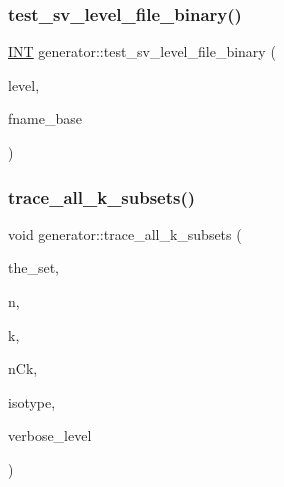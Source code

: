 \mbox{\label{classgenerator_a626488ba73670d1e4f163618f340a94f}} 
\subsubsection{\texorpdfstring{test\+\_\+sv\+\_\+level\+\_\+file\+\_\+binary()}{test\_sv\_level\_file\_binary()}}
{\footnotesize\ttfamily \mbox{\hyperlink{galois_8h_a09fddde158a3a20bd2dcadb609de11dc}{I\+NT}} generator\+::test\+\_\+sv\+\_\+level\+\_\+file\+\_\+binary (\begin{DoxyParamCaption}\item[{\mbox{\hyperlink{galois_8h_a09fddde158a3a20bd2dcadb609de11dc}{I\+NT}}}]{level,  }\item[{\mbox{\hyperlink{galois_8h_ab6cc7b4aeb6ea31aba2b3fbfc83ff5e6}{B\+Y\+TE}} $\ast$}]{fname\+\_\+base }\end{DoxyParamCaption})}

\mbox{\label{classgenerator_a1fd0b36d851eb2d4e9042b8a25b951c0}} 
\subsubsection{\texorpdfstring{trace\+\_\+all\+\_\+k\+\_\+subsets()}{trace\_all\_k\_subsets()}}
{\footnotesize\ttfamily void generator\+::trace\+\_\+all\+\_\+k\+\_\+subsets (\begin{DoxyParamCaption}\item[{\mbox{\hyperlink{galois_8h_a09fddde158a3a20bd2dcadb609de11dc}{I\+NT}} $\ast$}]{the\+\_\+set,  }\item[{\mbox{\hyperlink{galois_8h_a09fddde158a3a20bd2dcadb609de11dc}{I\+NT}}}]{n,  }\item[{\mbox{\hyperlink{galois_8h_a09fddde158a3a20bd2dcadb609de11dc}{I\+NT}}}]{k,  }\item[{\mbox{\hyperlink{galois_8h_a09fddde158a3a20bd2dcadb609de11dc}{I\+NT}} \&}]{n\+Ck,  }\item[{\mbox{\hyperlink{galois_8h_a09fddde158a3a20bd2dcadb609de11dc}{I\+NT}} $\ast$\&}]{isotype,  }\item[{\mbox{\hyperlink{galois_8h_a09fddde158a3a20bd2dcadb609de11dc}{I\+NT}}}]{verbose\+\_\+level }\end{DoxyParamCaption})}

